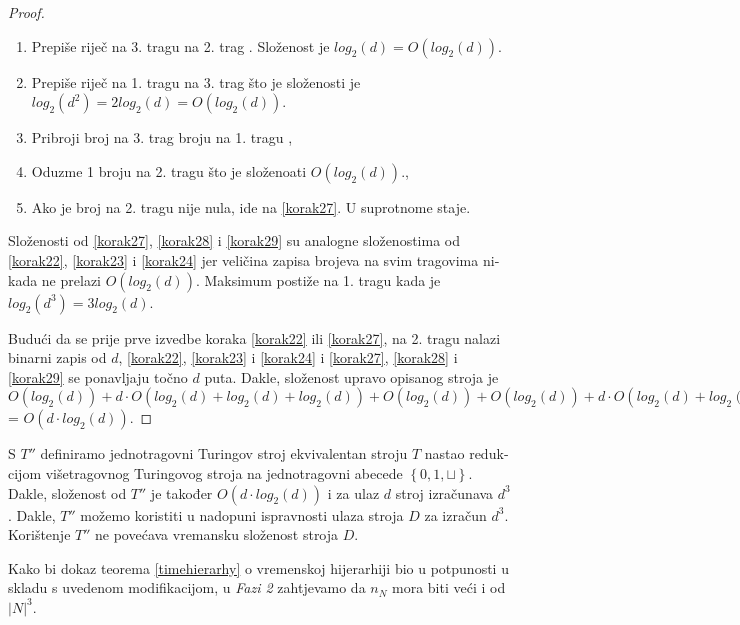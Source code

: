 \documentclass[12pt]{rectors}
\begin{document}
\begin{otherlanguage}{croatian}
\begin{proof}
\begin{enumerate}
    \item Prepiše riječ na 3. tragu na 2. trag \label{korak25}. \newline
    Složenost je $log_2(d) = O(log_2(d))$. 
    
    \item Prepiše riječ na 1. tragu na 3. trag  \label{korak26}\newline
    što je složenosti je $log_2(d^2) = 2log_2(d) = O(log_2(d))$.
    
    
    \item Pribroji broj na 3. trag broju na 1. tragu \label{korak27},
    \item Oduzme 1 broju na 2. tragu što je složenoati $O(log_2(d))$.\label{korak28},
    \item Ako je broj na 2. tragu nije nula, ide na \ref{korak27}. U suprotnome staje. \label{korak29}
\end{enumerate}
Složenosti od \ref{korak27}, \ref{korak28} i \ref{korak29} su analogne složenostima
od \ref{korak22}, \ref{korak23} i \ref{korak24} jer veličina zapisa brojeva na svim tragovima nikada ne prelazi $O(log_2(d))$. Maksimum postiže na 1. tragu kada je $log_2(d^3) = 3log_2(d)$.

Budući da se prije prve izvedbe koraka \ref{korak22} ili \ref{korak27},
na 2. tragu nalazi binarni zapis od $d$, \ref{korak22}, \ref{korak23} i \ref{korak24} i \ref{korak27}, \ref{korak28} i \ref{korak29} se ponavljaju točno $d$
puta. Dakle, složenost upravo opisanog stroja je $O(log_2(d)) + d \cdot O(log_2(d) + log_2(d) + log_2(d)) + O(log_2(d)) + O(log_2(d)) + d \cdot O(log_2(d) + log_2(d) + log_2(d))$ = $O(d \cdot log_2(d))$.

\end{proof}
S $T''$ definiramo jednotragovni Turingov stroj ekvivalentan stroju $T$ nastao redukcijom 
višetragovnog Turingovog stroja na jednotragovni abecede $\left\{ 0,1,\sqcup \right \}$. 
Dakle, složenost od $T''$ je također $O(d \cdot log_2(d))$ i za ulaz $d$ stroj izračunava $d^3$. Dakle, $T''$ možemo koristiti u nadopuni ispravnosti ulaza stroja $D$ za izračun $d^3$. Korištenje $T''$ ne povećava vremansku složenost stroja $D$.

Kako bi dokaz teorema \ref{timehierarhy} o vremenskoj hijerarhiji bio u potpunosti u skladu s
uvedenom modifikacijom, u \textit{Fazi 2} zahtjevamo da $n_N$ mora biti veći i od $\left | N \right |^3$.


\end{otherlanguage}
\end{document}
